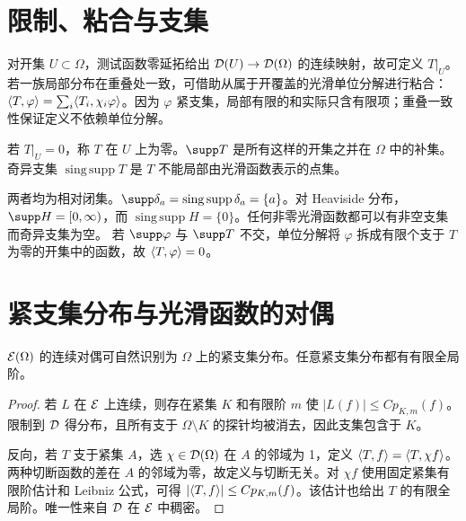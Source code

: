 \section{限制、粘合与支集}
对开集 $U\subset\Omega$，测试函数零延拓给出 $\mathcal{D}(U)\to\mathcal{D}(\Omega)$ 的连续映射，故可定义 $T|_U$。若一族局部分布在重叠处一致，可借助从属于开覆盖的光滑单位分解进行粘合：$\langle T,\varphi\rangle=\sum_i\langle T_i,\chi_i\varphi\rangle$。因为 $\varphi$ 紧支集，局部有限的和实际只含有限项；重叠一致性保证定义不依赖单位分解。
\begin{definition}[支集与奇异支集]
若 $T|_U=0$，称 $T$ 在 $U$ 上为零。$\supp T$ 是所有这样的开集之并在 $\Omega$ 中的补集。奇异支集 $\operatorname{sing\,supp}T$ 是 $T$ 不能局部由光滑函数表示的点集。
\end{definition}
两者均为相对闭集。$\supp\delta_a=\operatorname{sing\,supp}\delta_a=\{a\}$。对 Heaviside 分布，$\supp H=[0,\infty)$，而 $\operatorname{sing\,supp}H=\{0\}$。任何非零光滑函数都可以有非空支集而奇异支集为空。
若 $\supp\varphi$ 与 $\supp T$ 不交，单位分解将 $\varphi$ 拆成有限个支于 $T$ 为零的开集中的函数，故 $\langle T,\varphi\rangle=0$。

\section{紧支集分布与光滑函数的对偶}
\begin{theorem}\label{thm:Eprime}
$\mathcal{E}(\Omega)$ 的连续对偶可自然识别为 $\Omega$ 上的紧支集分布。任意紧支集分布都有有限全局阶。
\end{theorem}
\begin{proof}
若 $L$ 在 $\mathcal{E}$ 上连续，则存在紧集 $K$ 和有限阶 $m$ 使 $|L(f)|\le Cp_{K,m}(f)$。限制到 $\mathcal{D}$ 得分布，且所有支于 $\Omega\setminus K$ 的探针均被消去，因此支集包含于 $K$。

反向，若 $T$ 支于紧集 $A$，选 $\chi\in\mathcal{D}(\Omega)$ 在 $A$ 的邻域为 1，定义 $\langle T,f\rangle=\langle T,\chi f\rangle$。两种切断函数的差在 $A$ 的邻域为零，故定义与切断无关。对 $\chi f$ 使用固定紧集有限阶估计和 Leibniz 公式，可得 $|\langle T,f\rangle|\le Cp_{K,m}(f)$。该估计也给出 $T$ 的有限全局阶。唯一性来自 $\mathcal{D}$ 在 $\mathcal{E}$ 中稠密。
\end{proof}

